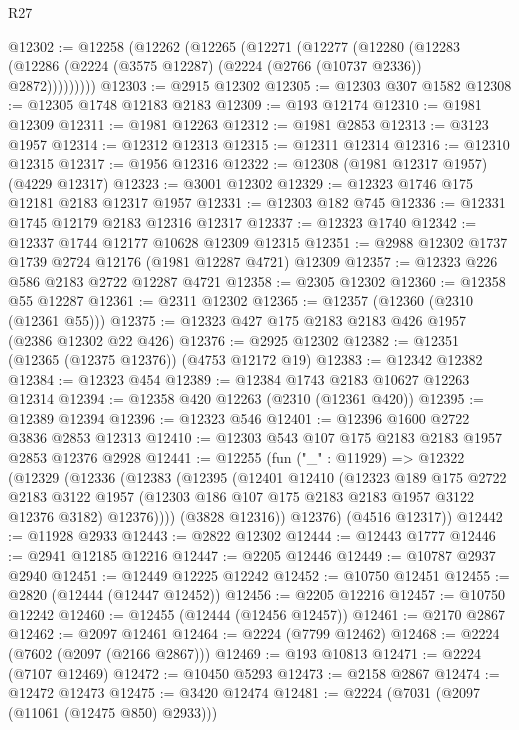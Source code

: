 \begin{lexlean}{R27}
\begin{coremodule}
@12302 := @12258
    (@12262
      (@12265
        (@12271
          (@12277
            (@12280
              (@12283 (@12286 (@2224 (@3575 @12287) (@2224 (@2766 (@10737 @2336)) @2872)))))))))
@12303 := @2915 @12302
@12305 := @12303 @307 @1582
@12308 := @12305 @1748 @12183 @2183
@12309 := @193 @12174
@12310 := @1981 @12309
@12311 := @1981 @12263
@12312 := @1981 @2853
@12313 := @3123 @1957
@12314 := @12312 @12313
@12315 := @12311 @12314
@12316 := @12310 @12315
@12317 := @1956 @12316
@12322 := @12308 (@1981 @12317 @1957) (@4229 @12317)
@12323 := @3001 @12302
@12329 := @12323 @1746 @175 @12181 @2183 @12317 @1957
@12331 := @12303 @182 @745
@12336 := @12331 @1745 @12179 @2183 @12316 @12317
@12337 := @12323 @1740
@12342 := @12337 @1744 @12177 @10628 @12309 @12315
@12351 := @2988 @12302 @1737 @1739 @2724 @12176 (@1981 @12287 @4721) @12309
@12357 := @12323 @226 @586 @2183 @2722 @12287 @4721
@12358 := @2305 @12302
@12360 := @12358 @55 @12287
@12361 := @2311 @12302
@12365 := @12357 (@12360 (@2310 (@12361 @55)))
@12375 := @12323 @427 @175 @2183 @2183 @426 @1957 (@2386 @12302 @22 @426)
@12376 := @2925 @12302
@12382 := @12351 (@12365 (@12375 @12376)) (@4753 @12172 @19)
@12383 := @12342 @12382
@12384 := @12323 @454
@12389 := @12384 @1743 @2183 @10627 @12263 @12314
@12394 := @12358 @420 @12263 (@2310 (@12361 @420))
@12395 := @12389 @12394
@12396 := @12323 @546
@12401 := @12396 @1600 @2722 @3836 @2853 @12313
@12410 := @12303 @543 @107 @175 @2183 @2183 @1957 @2853 @12376 @2928
@12441 := @12255
    (fun ("_" : @11929) =>
    @12322
      (@12329
        (@12336
          (@12383
            (@12395
              (@12401
                @12410
                (@12323
                  @189
                  @175
                  @2722
                  @2183
                  @3122
                  @1957
                  (@12303 @186 @107 @175 @2183 @2183 @1957 @3122 @12376 @3182)
                  @12376))))
          (@3828 @12316))
        @12376)
      (@4516 @12317))
@12442 := @11928 @2933
@12443 := @2822 @12302
@12444 := @12443 @1777
@12446 := @2941 @12185 @12216
@12447 := @2205 @12446
@12449 := @10787 @2937 @2940
@12451 := @12449 @12225 @12242
@12452 := @10750 @12451
@12455 := @2820 (@12444 (@12447 @12452))
@12456 := @2205 @12216
@12457 := @10750 @12242
@12460 := @12455 (@12444 (@12456 @12457))
@12461 := @2170 @2867
@12462 := @2097 @12461
@12464 := @2224 (@7799 @12462)
@12468 := @2224 (@7602 (@2097 (@2166 @2867)))
@12469 := @193 @10813
@12471 := @2224 (@7107 @12469)
@12472 := @10450 @5293
@12473 := @2158 @2867
@12474 := @12472 @12473
@12475 := @3420 @12474
@12481 := @2224 (@7031 (@2097 (@11061 (@12475 @850) @2933)))

\end{coremodule}
\end{lexlean}
